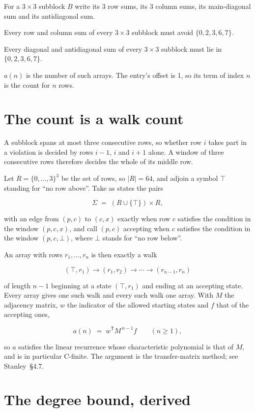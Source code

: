 \documentclass[11pt]{article}
\theoremstyle{definition}
\begin{document}
For a $3\times3$ subblock $B$ write its 3 row sums, its 3 column sums, its main-diagonal sum and its antidiagonal sum.

Every row and column sum of every $3\times3$ subblock must avoid $\{0, 2, 3, 6, 7\}$.

Every diagonal and antidiagonal sum of every $3\times3$ subblock must lie in $\{0, 2, 3, 6, 7\}$.

$a(n)$ is the number of such arrays. The entry's offset is 1, so its term of index $n$ is the count for $n$ rows.

\section{The count is a walk count}

A subblock spans at most three consecutive rows, so whether row $i$ takes part in a violation is decided by rows $i-1$, $i$ and $i+1$ alone. A window of three consecutive rows therefore decides the whole of its middle row.

Let $R = \{0,\dots,3\}^{3}$ be the set of rows, so $|R| = 64$, and adjoin a symbol $\top$ standing for ``no row above''. Take as states the pairs

\[\Sigma \;=\; (R \cup \{\top\}) \times R,\]

with an edge from $(p,c)$ to $(c,x)$ exactly when row $c$ satisfies the condition in the window $(p,c,x)$, and call $(p,c)$ accepting when $c$ satisfies the condition in the window $(p,c,\bot)$, where $\bot$ stands for ``no row below''.

An array with rows $r_1,\dots,r_n$ is then exactly a walk

\[(\top,r_1) \to (r_1,r_2) \to \cdots \to (r_{n-1},r_n)\]

of length $n-1$ beginning at a state $(\top,r_1)$ and ending at an accepting state. Every array gives one such walk and every such walk one array. With $M$ the adjacency matrix, $w$ the indicator of the allowed starting states and $f$ that of the accepting ones,

\[a(n) \;=\; w^{\mathsf T} M^{\,n-1} f \qquad (n \ge 1),\]

so $a$ satisfies the linear recurrence whose characteristic polynomial is that of $M$, and is in particular C-finite. The argument is the transfer-matrix method; see Stanley~\S4.7.

\section{The degree bound, derived}
\end{document}
